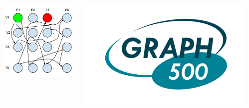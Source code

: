 \documentclass[final]{beamer}
\begin{document}
\begin{frame}[t]
\begin{columns}[t]
\begin{column}{0.60\paperwidth}
\begin{columns}[t,totalwidth=0.60\paperwidth]
\begin{column}{0.28\paperwidth}
\begin{columns}[t,totalwidth=0.28\paperwidth]
\begin{column}{0.12\paperwidth}
								\begin{center} \includegraphics[width=0.12\paperwidth]{img/linked_list/rand_proc_rand_node} \end{center}
							\end{column}
							\begin{column}{0.12\paperwidth}
								\begin{center} \includegraphics[width=0.12\paperwidth]{img/logo_graph500} \end{center}
							\end{column}
						\end{columns}
					\end{column}
					\begin{column}{0.28\paperwidth}

\end{column}
\end{columns}
\end{column}
\end{columns}
\end{frame}
\end{document}
